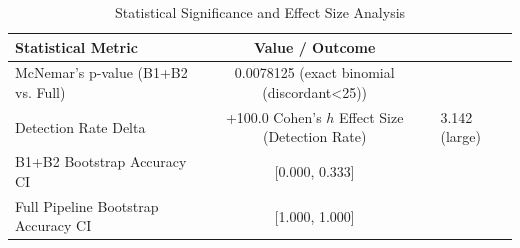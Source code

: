 \begin{table}[h]
\centering
\caption{Statistical Significance and Effect Size Analysis}
\label{tab:semantic_stats}
\begin{tabular}{lc}
\hline
\textbf{Statistical Metric} & \textbf{Value / Outcome} \\ \hline
McNemar's p-value (B1+B2 vs. Full) & 0.0078125 (exact binomial (discordant<25)) \\
Detection Rate Delta & +100.0%
Cohen's $h$ Effect Size (Detection Rate) & 3.142 (large) \\
B1+B2 Bootstrap Accuracy CI & [0.000, 0.333] \\
Full Pipeline Bootstrap Accuracy CI & [1.000, 1.000] \\
\hline
\end{tabular}
\end{table}
